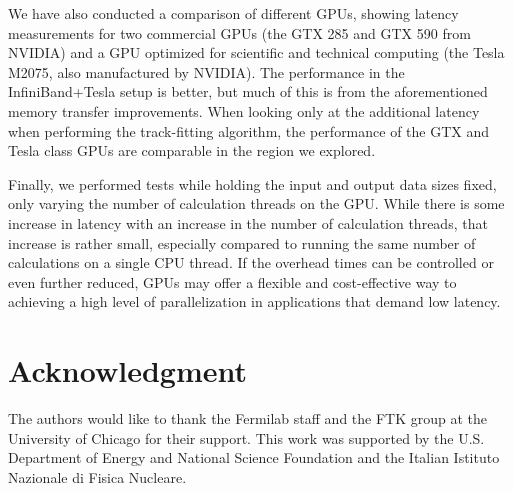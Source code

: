 \documentclass[journal]{IEEEtran}
\begin{document}
We have also conducted a comparison of different GPUs, showing latency 
measurements for two commercial GPUs (the GTX 285 and GTX 590 from NVIDIA) 
and a GPU optimized for scientific and technical computing (the Tesla M2075, 
also manufactured by NVIDIA). The performance in the InfiniBand+Tesla setup is 
better, but much of this is from the aforementioned memory transfer improvements.
When looking only at the additional latency when performing the track-fitting algorithm, 
the performance of the GTX and Tesla class GPUs are comparable in the region we explored.

Finally, we performed tests while holding the input and output data sizes fixed, only varying the number of 
calculation threads on the GPU. While there is some increase in latency with an increase in the number of
calculation threads, that increase is rather small, especially compared to running the same number of 
calculations on a single CPU thread. If the overhead times can be controlled or even further reduced, GPUs 
may offer a flexible and cost-effective way to achieving a high level of parallelization in applications that demand low latency.



%

\section*{Acknowledgment}
The authors would like to thank the Fermilab staff and the FTK group at the 
University of Chicago for their support. This work was supported by the
U.S. Department of Energy and National Science Foundation and the Italian
Istituto Nazionale di Fisica Nucleare. 
\end{document}
